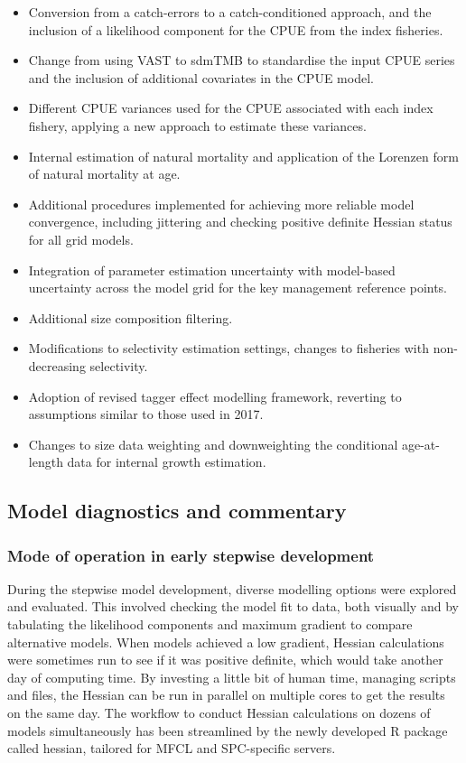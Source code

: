 \begin{itemize}
  \item Conversion from a catch-errors to a catch-conditioned approach, and the inclusion of a likelihood component for the CPUE from the index fisheries.
  \item Change from using VAST to sdmTMB to standardise the input CPUE series and the inclusion of additional covariates in the CPUE model.
  \item Different CPUE variances used for the CPUE associated with each index fishery, applying a new approach to estimate these variances.
  \item Internal estimation of natural mortality and application of the Lorenzen form of natural mortality at age.
  \item Additional procedures implemented for achieving more reliable model convergence, including jittering and checking positive definite Hessian status for all grid models.
  \item Integration of parameter estimation uncertainty with model-based uncertainty across the model grid for the key management reference points.
  \item Additional size composition filtering.
  \item Modifications to selectivity estimation settings, changes to fisheries with non-decreasing selectivity.
  \item Adoption of revised tagger effect modelling framework, reverting to assumptions similar to those used in 2017.
  \item Changes to size data weighting and downweighting the conditional age-at-length data for internal growth estimation.
\end{itemize}

\subsection{Model diagnostics and commentary}
\label{sec:model_diagnostics}

\subsubsection{Mode of operation in early stepwise development}

During the stepwise model development, diverse modelling options were explored and evaluated. This involved checking the model fit to data, both visually and by tabulating the likelihood components and maximum gradient to compare alternative models. When models achieved a low gradient, Hessian calculations were sometimes run to see if it was positive definite, which would take another day of computing time. By investing a little bit of human time, managing scripts and files, the Hessian can be run in parallel on multiple cores to get the results on the same day. The workflow to conduct Hessian calculations on dozens of models simultaneously has been streamlined by the newly developed R package called \textsf{hessian}, tailored for MFCL and SPC-specific servers.

